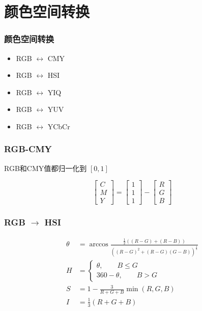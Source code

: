 \documentclass{beamer}
\begin{document}
\section{颜色空间转换}
\label{sec-3}
\begin{frame}
\frametitle{颜色空间转换}
\label{sec-3-1}

\begin{itemize}
\item RGB $\leftrightarrow$   CMY
\item RGB $\leftrightarrow$  HSI
\item RGB $\leftrightarrow$  YIQ
\item RGB $\leftrightarrow$  YUV
\item RGB $\leftrightarrow$   YCbCr
\end{itemize}
\end{frame}
\begin{frame}
\frametitle{RGB-CMY}
\label{sec-3-2}


RGB和CMY值都归一化到  $[0,1]$

\[ \begin{bmatrix}
C \\
M\\
Y
\end{bmatrix}=
\begin{bmatrix}
1\\
1\\
1
\end{bmatrix}-
\begin{bmatrix}
R\\
G\\
B
\end{bmatrix} \]
\end{frame}
\begin{frame}
\frametitle{RGB $\to$ HSI}
\label{sec-3-3}

\begin{align*}
\theta &=\arccos\frac{\frac{1}{2}((R-G)+(R-B))}{((R-G)^2+(R-G)(G-B))^{\frac{1}{2}}}\\
H &=
\begin{cases}
\theta, \qquad B\leq G \\
360-\theta, \qquad B>G
\end{cases} \\
S &= 1 - \frac{3}{R+G+B}\min(R,G,B) \\
I &= \frac{1}{3}(R+G+B)
\end{align*}
\end{frame}
\end{document}
